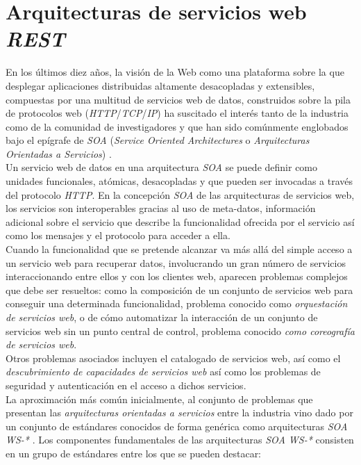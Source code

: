 \section{Arquitecturas de servicios web \textit{REST}}

En los \'ultimos diez a\~nos, la visi\'on de la Web como una plataforma sobre la que desplegar aplicaciones distribuidas altamente desacopladas y extensibles, compuestas por una multitud de servicios web de datos, construidos sobre la pila de protocolos web (\textit{HTTP}/\textit{TCP}/\textit{IP}) ha suscitado el inter\'es tanto de la industria como de la comunidad de investigadores y que han sido com\'unmente englobados bajo el ep\'igrafe de \textit{SOA} (\textit{Service Oriented Architectures} o \textit{Arquitecturas Orientadas a Servicios}) \cite{soa}.\\
Un servicio web de datos en una arquitectura \textit{SOA} se puede definir como unidades funcionales, at\'omicas, desacopladas y que pueden ser invocadas a trav\'es del protocolo \textit{HTTP}. En la concepci\'on \textit{SOA} de las arquitecturas de servicios web, los servicios son interoperables gracias al uso de meta-datos, informaci\'on adicional sobre el servicio que describe la funcionalidad ofrecida por el servicio as\'i como los mensajes y el protocolo para acceder a ella.\\
Cuando la funcionalidad que se pretende alcanzar va m\'as all\'a del simple acceso a un servicio web para recuperar datos, involucrando un gran n\'umero de servicios interaccionando entre ellos y con los clientes web, aparecen problemas complejos que debe ser resueltos: como la composici\'on de un conjunto de servicios web para conseguir una determinada funcionalidad, problema conocido como \textit{orquestaci\'on de servicios web}, o de c\'omo automatizar la interacci\'on de un conjunto de servicios web sin un punto central de control, problema conocido \textit{como coreograf\'ia de servicios web}. \cite{orchestration_choreography}\\
Otros problemas asociados incluyen el catalogado de servicios web, as\'i como el \textit{descubrimiento de capacidades de servicios web} \cite{hoschek2002web} as\'i como los problemas de seguridad y autenticaci\'on en el acceso a dichos servicios.\\
La aproximaci\'on m\'as com\'un inicialmente, al conjunto de problemas que presentan las \textit{arquitecturas orientadas a servicios} entre la industria vino dado por un conjunto de est\'andares conocidos de forma gen\'erica como arquitecturas \textit{SOA WS-*} \cite{viering2009lacking}. 
Los componentes fundamentales de las arquitecturas \textit{SOA WS-*} consisten en un grupo de est\'andares entre los que se pueden destacar:\\

